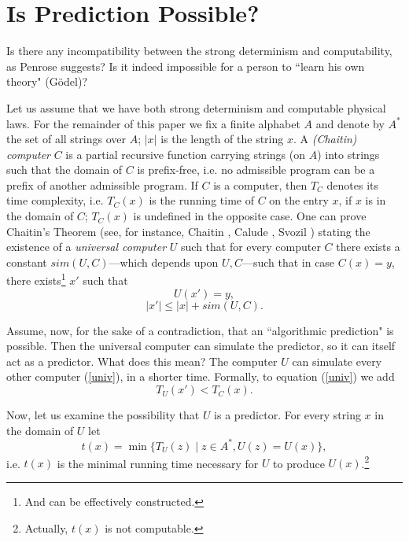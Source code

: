 \section{Is Prediction Possible?}
   Is there any  incompatibility between the strong determinism
and computability, as Penrose  suggests?  Is it indeed impossible
for a person to
``learn his own theory" (G\" odel)?



Let us  assume that we have both strong determinism
and
computable
physical laws.  For the remainder of this paper we fix a finite
alphabet $A$ and denote by $A^*$ the set of all strings over $A$; $|x|$ is the
length of the string $x$.
A {\it (Chaitin) computer} $C$ is  a partial recursive function carrying
strings  (on  $A$) into strings such that the domain of
$C$ is prefix-free, i.e. no admissible program can be a prefix of another
admissible program. If $C$ is a  computer, then $T_C$ denotes its
time complexity, i.e. $T_C(x)$ is the running time of $C$ on the entry $x$, if
$x$ is in the domain of $C$; $T_C(x)$ is undefined in the opposite case.
One can prove Chaitin's
Theorem (see,
for instance, Chaitin \cite{ch8,ch9}, Calude \cite{cris}, Svozil \cite{svozil})
stating
the existence of a {\it universal computer} $U$ such that for every
computer $C$ there
exists a constant $sim(U,C)$---which depends upon $U,C$---such that in case
$C(x)=y$,
 there exists\footnote{And can be effectively constructed.} $x'$ such that
\begin{equation}
\label{univ}
U(x')=y,
\end{equation}
 \begin{equation}
\label{optimal1}
  |x'| \leq |x| + sim(U,C).
\end{equation}




 Assume,  now, for the sake of a contradiction, that an
``algorithmic prediction" is possible. Then
the universal computer can simulate the predictor, so it can  itself act as
a predictor. What
does this mean? The computer $U$ can simulate every other computer (\ref{univ}),
in a shorter time.
Formally, to equation (\ref{univ})  we add
\begin{equation}
\label{optimal2}
  T_U(x') < T_C(x).
\end{equation}

Now, let us examine the possibility that $U$ is a predictor. For every
string $x$ in the domain
of $U$  let
\begin{equation}
\label{time}
t(x)= \min\{ T_U(z)\mid z\in A^\ast , U(z)=U(x)\},
\end{equation}
i.e. $t(x)$
is the minimal running time necessary for $U$ to produce
$U(x)$.\footnote{Actually,
$t(x)$  is not computable.}

